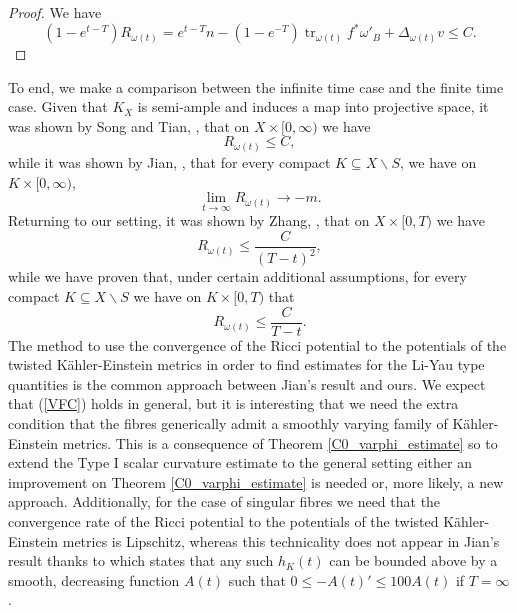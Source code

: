 \documentclass[12pt]{article}
\numberwithin{equation}{section}
\DeclareMathOperator{\tr}{tr}
\begin{document}
\begin{proof}
We have
\begin{equation*}
    (1-e^{t-T}) R_{\omega(t)} = e^{t-T}n - (1-e^{-T})\tr_{\omega(t)} f^*\omega'_B + \Delta_{\omega(t)} v \leq C.
\end{equation*}
\end{proof}

\noindent To end, we make a comparison between the infinite time case and the finite time case. Given that $K_X$ is semi-ample and induces a map into projective space, it was shown by Song and Tian, \cite{ST16}, that on $X \times [0,\infty)$ we have
\begin{equation*}
    R_{\omega(t)} \leq C,
\end{equation*}
while it was shown by Jian, \cite{J20}, that for every compact $K \subseteq X \backslash S$, we have on $K \times [0, \infty)$,
\begin{equation*}
    \lim_{t \to \infty} R_{\omega(t)} \to -m.
\end{equation*}
Returning to our setting, it was shown by Zhang, \cite{Z10}, that on $X \times [0,T)$ we have
\begin{equation*}
    R_{\omega(t)} \leq \frac{C}{(T-t)^2},
\end{equation*}
while we have proven that, under certain additional assumptions, for every compact $K \subseteq X \backslash S$ we have on $K \times [0,T)$ that
\begin{equation*}
    R_{\omega(t)} \leq \frac{C}{T-t}.
\end{equation*}
The method to use the convergence of the Ricci potential to the potentials of the twisted K\"ahler-Einstein metrics in order to find estimates for the Li-Yau type quantities is the common approach between Jian's result and ours. We expect that (\ref{VFC}) holds in general, but it is interesting that we need the extra condition that the fibres generically admit a smoothly varying family of K\"ahler-Einstein metrics. This is a consequence of Theorem \ref{C0_varphi_estimate} so to extend the Type I scalar curvature estimate to the general setting either an improvement on Theorem \ref{C0_varphi_estimate} is needed or, more likely, a new approach. Additionally, for the case of singular fibres we need that the convergence rate of the Ricci potential to the potentials of the twisted K\"ahler-Einstein metrics is Lipschitz, whereas this technicality does not appear in Jian's result thanks to \cite[Lem. 4.1]{J20} which states that any such $h_K(t)$ can be bounded above by a smooth, decreasing function $A(t)$ such that $0 \leq -A(t)' \leq 100A(t)$ if $T = \infty$.
\end{document}

